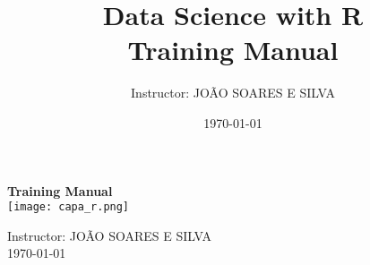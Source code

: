 \documentclass[12pt,a4paper]{article}
\title{\textbf{Data Science with R \\Training Manual}}
\author{Instructor: JOÃO SOARES E SILVA}
\date{\today}
\begin{document}
\begin{titlepage}
    \centering
    \vspace*{1cm} %
    {\color{sectionred}\huge\textbf{Training Manual}} \\
    \vspace{0.5cm}
    \texttt{[image: capa\_r.png]} %
    \vspace{1cm} %

    {\large Instructor: JOÃO SOARES E SILVA} \\
    \vspace{0.5cm}
    {\today}
\end{titlepage}

\maketitle
\tableofcontents
\newpage


















\end{document}
